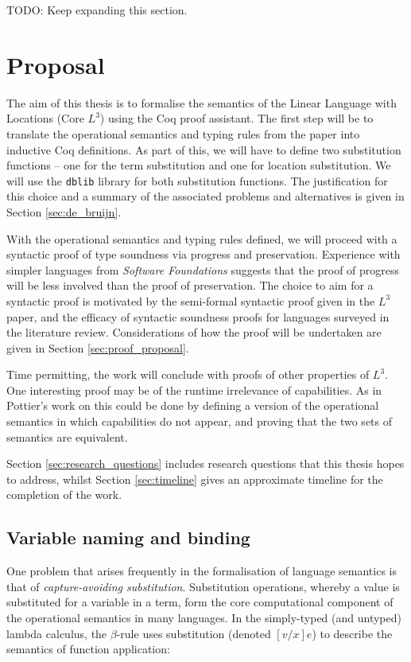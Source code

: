 \documentclass[]{unswthesis}
\newcommand{\SSPHS}{\text{SSPHS }}
\let\c\texttt
\let\i\textit
\begin{document}
TODO: Keep expanding this section.

\chapter{Proposal}
\label{ch:proposal}

The aim of this thesis is to formalise the semantics of the Linear Language with Locations (Core $L^3$) using the Coq proof assistant. The first step will be to translate the operational semantics and typing rules from the paper \cite{ahmed05} into inductive Coq definitions. As part of this, we will have to define two substitution functions -- one for the term substitution and one for location substitution. We will use the \c{dblib} library \cite{dblib13} for both substitution functions. The justification for this choice and a summary of the associated problems and alternatives is given in Section \ref{sec:de_bruijn}.

With the operational semantics and typing rules defined, we will proceed with a syntactic proof of type soundness via progress and preservation. Experience with simpler languages from \i{Software Foundations} \cite{pierce15} suggests that the proof of progress will be less involved than the proof of preservation. The choice to aim for a syntactic proof is motivated by the semi-formal syntactic proof given in the $L^3$ paper, and the efficacy of syntactic soundness proofs for languages surveyed in the literature review. Considerations of how the proof will be undertaken are given in Section \ref{sec:proof_proposal}.

Time permitting, the work will conclude with proofs of other properties of $L^3$. One interesting proof may be of the runtime irrelevance of capabilities. As in Pottier's  work on \SSPHS \cite{pottier13} this could be done by defining a version of the operational semantics in which capabilities do not appear, and proving that the two sets of semantics are equivalent.

Section \ref{sec:research_questions} includes research questions that this thesis hopes to address, whilst Section \ref{sec:timeline} gives an approximate timeline for the completion of the work.

\section{Variable naming and binding}
\label{sec:var_naming}

One problem that arises frequently in the formalisation of language semantics is that of \i{capture-avoiding substitution}. Substitution operations, whereby a value is substituted for a variable in a term, form the core computational component of the operational semantics in many languages. In the simply-typed (and untyped) lambda calculus, the $\beta$-rule uses substitution (denoted $[v/x]e$) to describe the semantics of function application:
\end{document}
